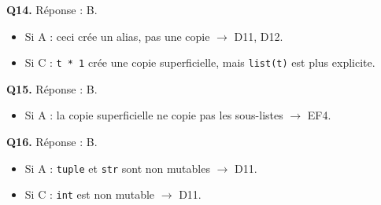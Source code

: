 \textbf{Q14.} Réponse : B.
\begin{itemize}[nosep]
  \item Si A : ceci crée un alias, pas une copie $\to$ D11, D12.
  \item Si C : \lstinline{t * 1} crée une copie superficielle, mais \lstinline{list(t)} est plus explicite.
\end{itemize}

\textbf{Q15.} Réponse : B.
\begin{itemize}[nosep]
  \item Si A : la copie superficielle ne copie pas les sous-listes $\to$ EF4.
\end{itemize}

\textbf{Q16.} Réponse : B.
\begin{itemize}[nosep]
  \item Si A : \lstinline{tuple} et \lstinline{str} sont non mutables $\to$ D11.
  \item Si C : \lstinline{int} est non mutable $\to$ D11.
\end{itemize}
